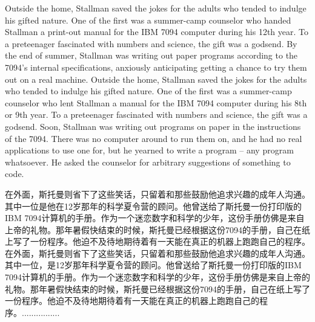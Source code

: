 \ifdefined\eng
\ifdefined\vone
Outside the home, Stallman saved the jokes for the adults who tended to indulge his gifted nature. One of the first was a summer-camp counselor who handed Stallman a print-out manual for the IBM 7094 computer during his 12th year. To a preteenager fascinated with numbers and science, the gift was a godsend. By the end of summer, Stallman was writing out paper programs according to the 7094's internal specifications, anxiously anticipating getting a chance to try them out on a real machine.
\fi
\ifdefined\vtwo
Outside the home, Stallman saved the jokes for the adults who tended to indulge his gifted nature. One of the first was a summer-camp counselor who lent Stallman a manual for the IBM 7094 computer during his 8th or 9th year. To a preteenager fascinated with numbers and science, the gift was a godsend. Soon, Stallman was writing out programs on paper in the instructions of the 7094.  There was no computer around to run them on, and he had no real applications to use one for, but he yearned to write a program -- any program whatsoever.  He asked the counselor for arbitrary suggestions of something to code.
\fi
\fi

\ifdefined\chs
\ifdefined\vone
在外面，斯托曼则省下了这些笑话，只留着和那些鼓励他追求兴趣的成年人沟通。其中一位是他在12岁那年的科学夏令营的顾问。他曾送给了斯托曼一份打印版的IBM 7094计算机的手册。作为一个迷恋数字和科学的少年，这份手册仿佛是来自上帝的礼物。那年暑假快结束的时候，斯托曼已经根据这份7094的手册，自己在纸上写了一份程序。他迫不及待地期待着有一天能在真正的机器上跑跑自己的程序。
\fi
\ifdefined\vtwo
在外面，斯托曼则省下了这些笑话，只留着和那些鼓励他追求兴趣的成年人沟通。其中一位，是12岁那年科学夏令营的顾问。他曾送给了斯托曼一份打印版的IBM 7094计算机的手册。作为一个迷恋数字和科学的少年，这份手册仿佛是来自上帝的礼物。那年暑假快结束的时候，斯托曼已经根据这份7094的手册，自己在纸上写了一份程序。他迫不及待地期待着有一天能在真正的机器上跑跑自己的程序。................
\fi
\fi

